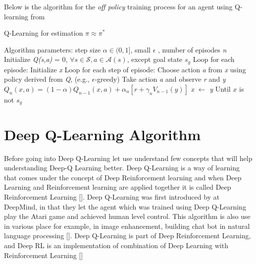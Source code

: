 \documentclass[12pt]{article}
\begin{document}
Below is the algorithm for the \textit{off policy} training process for an agent using Q-learning from \cite{Sutton_Barto_2020}

\begin{algorithm}
\caption{Q-Learning for estimation $\pi \approx \pi^*$}
\label{alg:q_learning}
\begin{algorithmic}[1]
\State Algorithm parameters: step size $\alpha \in (0, 1]$, small $\epsilon$ , number of episodes \textit{n}
\State Initialize \textit{Q(s,a)} = 0, $\forall s \in \mathcal{S}, a \in \mathcal{A}(s)$, except goal state $s_g$
\State
\State Loop for each episode:
    \State \hspace{\algorithmicindent} Initialize \textit{x}
    \State \hspace{\algorithmicindent} Loop for each step of episode:
        \State \hspace{\algorithmicindent} \hspace{\algorithmicindent} Choose action \textit{a} from \textit{x} using policy derived from \textit{Q}, (e.g., $\epsilon$-greedy)
        \State \hspace{\algorithmicindent} \hspace{\algorithmicindent} Take action \textit{a} and observe \textit{r} and \textit{y}
        \State \hspace{\algorithmicindent} \hspace{\algorithmicindent} $Q_n(x, a) = (1 - \alpha) Q_{n-1}(x,a) + \alpha_n[r + \gamma_n V_{n-1}(y)]$
        \State \hspace{\algorithmicindent} \hspace{\algorithmicindent} \textit{x} $\leftarrow$ \textit{y}
    \State \hspace{\algorithmicindent} Until $x$ is not $s_g$ 
\end{algorithmic}
\end{algorithm}

\section{Deep Q-Learning Algorithm}

Before going into Deep Q-Learning let use understand few concepts that will help understanding Deep-Q Learning better. Deep Q-Learning is a way of learning that comes under the concept of Deep Reinforcement learning and when Deep Learning and Reinforcement learning are applied together it is called Deep Reinforcement Learning [\cite{yuxi}]. Deep Q-Learning was first introduced by \cite{mnih} at DeepMind, in that they let the agent which was trained using Deep Q-Learning play the Atari game and achieved human level control. This algorithm is also use in various place for example, in image enhancement, building chat bot in natural language processing [\cite{yuxi}]. Deep Q-Learning is part of Deep Reinforcement Learning, and Deep RL is an implementation of combination of Deep Learning with Reinforcement Learning [\cite{Zou_Han_So_2008}]
\end{document}
